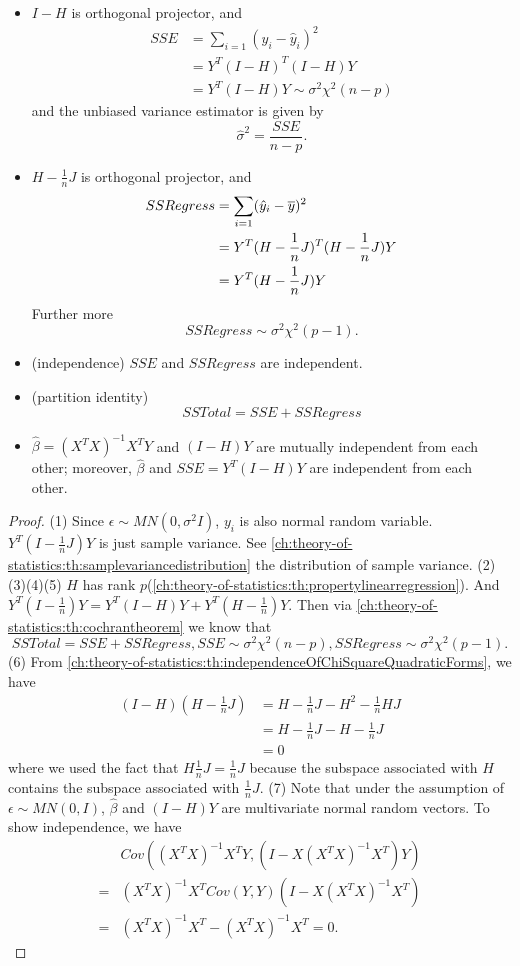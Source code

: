 \begin{refsection}
\begin{theorem}
\begin{itemize}
		\item $I-H$ is orthogonal projector, and 
		\begin{align*}
		SSE&= \sum_{i=1} (y_i - \hat{y}_i)^2\\
		&=Y^T(I-H)^T(I - H)Y\\
		&=Y^T(I - H)Y \sim \sigma^2 \chi^2(n-p)
		\end{align*}
		and the unbiased variance estimator is given by
		$$\hat{\sigma}^2 = \frac{SSE}{n-p}.$$
		\item $H-\frac{1}{n}J$ is orthogonal projector, and 
		\begin{align*}
		SSRegress &= \sum_{i=1} (\hat{y}_i - \overline{y})^2\\
		&=Y^T(H - \frac{1}{n}J)^T(H - \frac{1}{n}J) Y \\
		&=Y^T(H - \frac{1}{n}J) Y 
		\end{align*}
		Further more $$SSRegress \sim \sigma^2 \chi^2(p-1).$$	
		\item (independence) 
		$SSE$ and $SSRegress$ are independent.
		\item (partition identity)
		$$SSTotal = SSE + SSRegress$$
		\item $\hat{\beta} = (X^TX)^{-1}X^TY$ and $(I-H)Y$ are mutually independent from each other; moreover, $\hat{\beta}$ and $SSE = Y^T(I-H)Y$ are independent from each other.
	\end{itemize}
\end{theorem}
\begin{proof}
	(1) 
	Since $\epsilon\sim MN(0,\sigma^2I)$, $y_i$ is also normal random variable. 
	$Y^T(I-\frac{1}{n}J)Y$ is just sample variance. See \autoref{ch:theory-of-statistics:th:samplevariancedistribution} the distribution of sample variance.
	(2)(3)(4)(5) $H$ has rank $p$(\autoref{ch:theory-of-statistics:th:propertylinearregression}). And $Y^T(I - \frac{1}{n})Y = Y^T(I - H)Y + Y^T(H - \frac{1}{n})Y$. Then via \autoref{ch:theory-of-statistics:th:cochrantheorem} we know that
	$$SSTotal = SSE + SSRegress, SSE\sim \sigma^2\chi^2(n-p), SSRegress\sim \sigma^2\chi^2(p-1). $$ 
	(6) From \autoref{ch:theory-of-statistics:th:independenceOfChiSquareQuadraticForms}, we have
	\begin{align*}
	(I-H)(H-\frac{1}{n}J) &= H - \frac{1}{n}J - H^2 - \frac{1}{n}HJ \\
	&= H - \frac{1}{n}J - H - \frac{1}{n}J \\
	&= 0
	\end{align*}
	where we used the fact that $H\frac{1}{n}J = \frac{1}{n}J$ because the subspace associated with $H$ contains the subspace associated with $\frac{1}{n}J$. 
	(7) Note that under the assumption of $\epsilon\sim MN(0,I)$, $\hat{\beta}$ and $(I-H)Y$ are multivariate normal random vectors. To show independence, we have
	\begin{align*}
	&Cov((X^TX)^{-1}X^TY,(I-X(X^TX)^{-1}X^T)Y)\\
	=& (X^TX)^{-1}X^T Cov(Y,Y)(I-X(X^TX)^{-1}X^T)\\
	=& (X^TX)^{-1}X^T - (X^TX)^{-1}X^T = 0.
	\end{align*}
	

\end{proof}
\end{refsection}

